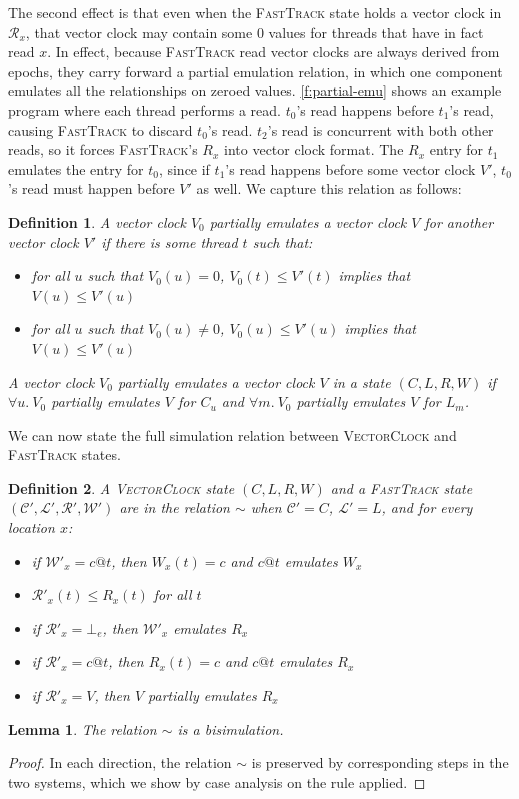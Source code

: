 \documentclass[preprint, 9pt]{sigplanconf}
\newcommand{\Tid}{t}
\newcommand{\VC}{V}
\newcommand{\VCalg}{\textsc{VectorClock}\xspace}
\newcommand{\FT}{\textsc{FastTrack}\xspace}
\newtheorem{lemma}{Lemma}
\newtheorem{definition}{Definition}
\begin{document}
The second effect is that even when the \FT state holds a vector clock in $\mathcal{R}_x$, that vector clock may contain some 0 values for threads that have in fact read $x$. In effect, because \FT read vector clocks are always derived from epochs, they carry forward a partial emulation relation, in which one component emulates all the relationships on zeroed values. \autoref{f:partial-emu} shows an example program where each thread performs a read. $\Tid_0$'s read happens before $\Tid_1$'s read, causing \FT to discard $\Tid_0$'s read. $\Tid_2$'s read is concurrent with both other reads, so it forces \FT's $R_x$ into vector clock format. The $R_x$ entry for $\Tid_1$ emulates the entry for $\Tid_0$, since if $\Tid_1$'s read happens before some vector clock $\VC'$, $\Tid_0$'s read must happen before $\VC'$ as well. We capture this relation as follows:
\begin{definition}A vector clock $V_0$ \emph{partially emulates} a vector clock $V$ for another vector clock $V'$ if there is some thread $t$ such that:

\begin{itemize}
\item for all $u$ such that $V_0(u) = 0$, $V_0(t) \le V'(t)$ implies that $V(u) \le V'(u)$
\item for all $u$ such that $V_0(u) \neq 0$, $V_0(u) \le V'(u)$ implies that $V(u) \le V'(u)$
\end{itemize}
A vector clock $V_0$ partially emulates a vector clock $V$ in a state $(C, L, R, W)$ if $\forall u.\ V_0$ partially emulates $V$ for $C_u$ and $\forall m.\ V_0$ partially emulates $V$ for $L_m$.\end{definition}

We can now state the full simulation relation between \VCalg and \FT states.
\begin{definition}A \VCalg state $(C, L, R, W)$ and a \FT state $(\mathcal{C}', \mathcal{L}', \mathcal{R}', \mathcal{W}')$ are in the relation $\sim$ when $\mathcal{C}' = C$, $\mathcal{L}' = L$, and for every location $x$:
\begin{itemize}
\item if $\mathcal{W}'_x = c@t$, then $W_x(t) = c$ and $c@t$ emulates $W_x$
\item $\mathcal{R}'_x(t) \le R_x(t)$ for all $t$
\item if $\mathcal{R}'_x = \bot_e$, then $\mathcal{W}'_x$ emulates $R_x$
\item if $\mathcal{R}'_x = c@t$, then $R_x(t) = c$ and $c@t$ emulates $R_x$
\item if $\mathcal{R}'_x = V$, then $V$ partially emulates $R_x$
\end{itemize}
\end{definition}
\begin{lemma}The relation $\sim$ is a bisimulation.\end{lemma}
\begin{proof}In each direction, the relation $\sim$ is preserved by corresponding steps in the two systems, which we show by case analysis on the rule applied.\end{proof}
\end{document}
